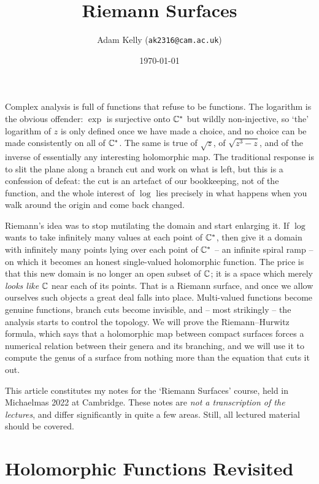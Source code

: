 \documentclass[a4paper]{scrartcl}
\title{Riemann Surfaces}
\author{Adam Kelly (\texttt{ak2316@cam.ac.uk})}
\date{\today}
\begin{document}
\maketitle

Complex analysis is full of functions that refuse to be functions. The logarithm is the
obvious offender: $\exp$ is surjective onto $\mathbb{C}^*$ but wildly non-injective, so `the'
logarithm of $z$ is only defined once we have made a choice, and no choice can be made
consistently on all of $\mathbb{C}^*$. The same is true of $\sqrt{z}$, of $\sqrt{z^3 - z}$, and
of the inverse of essentially any interesting holomorphic map. The traditional response
is to slit the plane along a branch cut and work on what is left, but this is a
confession of defeat: the cut is an artefact of our bookkeeping, not of the function,
and the whole interest of $\log$ lies precisely in what happens when you walk around the
origin and come back changed.

Riemann's idea was to stop mutilating the domain and start enlarging it. If $\log$ wants
to take infinitely many values at each point of $\mathbb{C}^*$, then give it a domain with
infinitely many points lying over each point of $\mathbb{C}^*$ -- an infinite spiral ramp -- on
which it becomes an honest single-valued holomorphic function. The price is that this new
domain is no longer an open subset of $\mathbb{C}$; it is a space which merely \emph{looks like}
$\mathbb{C}$ near each of its points. That is a Riemann surface, and once we allow ourselves such
objects a great deal falls into place. Multi-valued functions become genuine functions,
branch cuts become invisible, and -- most strikingly -- the analysis starts to control the
topology. We will prove the Riemann--Hurwitz formula, which says that a holomorphic map
between compact surfaces forces a numerical relation between their genera and its
branching, and we will use it to compute the genus of a surface from nothing more than
the equation that cuts it out.

This article constitutes my notes for the `Riemann Surfaces' course, held in Michaelmas
2022 at Cambridge. These notes are \emph{not a transcription of the lectures}, and differ
significantly in quite a few areas. Still, all lectured material should be covered.

\tableofcontents

\section{Holomorphic Functions Revisited}
\end{document}
